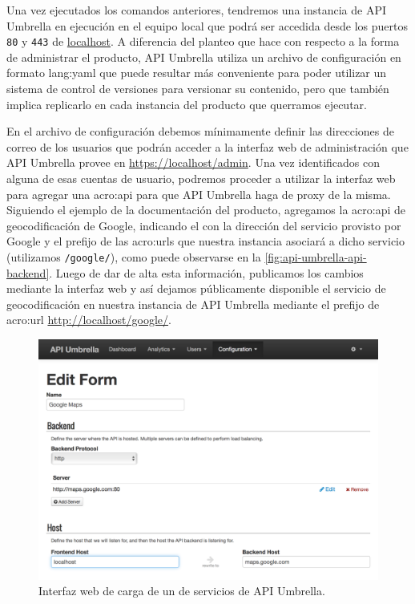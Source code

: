
Una vez ejecutados los comandos anteriores, tendremos una instancia de API Umbrella en ejecución en el equipo local que podrá ser accedida desde los puertos \texttt{80} y \texttt{443} de \url{localhost}. A diferencia del planteo que  hace con respecto a la forma de administrar el producto, API Umbrella utiliza un archivo de configuración en formato \gls{lang:yaml} que puede resultar más conveniente para poder utilizar un sistema de control de versiones para versionar su contenido, pero que también implica replicarlo en cada instancia del producto que querramos ejecutar.

En el archivo de configuración debemos mínimamente definir las direcciones de correo de los usuarios que podrán acceder a la interfaz web de administración que API Umbrella provee en \url{https://localhost/admin}. Una vez identificados con alguna de esas cuentas de usuario, podremos proceder a utilizar la interfaz web para agregar una \gls{acro:api} para que API Umbrella haga de proxy de la misma. Siguiendo el ejemplo de la documentación del producto, agregamos la \gls{acro:api} de geocodificación de Google, indicando el  con la dirección del servicio provisto por Google y el prefijo de las \glspl{acro:url} que nuestra instancia asociará a dicho servicio (utilizamos \texttt{/google/}), como puede observarse en la \autoref{fig:api-umbrella-api-backend}. Luego de dar de alta esta información, publicamos los cambios mediante la interfaz web y así dejamos públicamente disponible el servicio de geocodificación en nuestra instancia de API Umbrella mediante el prefijo de \gls{acro:url} \url{http://localhost/google/}.

\begin{figure}
  \includegraphics[width=\linewidth]{src/images/02-capitulo-2/tecnologias/api-umbrella/api-backend.png}
  \caption{Interfaz web de carga de un  de servicios de API Umbrella.}
  \label{fig:api-umbrella-api-backend}
\end{figure}

